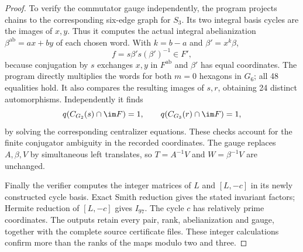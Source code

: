 \begin{proof}
To verify the commutator gauge independently, the program projects
chains to the corresponding six-edge graph for $S_3$. Its two
integral basis cycles are the images of $x,y$. Thus it computes the
actual integral abelianization $\beta^{\mathrm{ab}}=ax+by$ of each
chosen word. With $k=b-a$ and $\beta'=x^k\beta$,
\[
 f=s\beta's(\beta')^{-1}\in F',
\]
because conjugation by $s$ exchanges $x,y$ in $F^{\mathrm{ab}}$ and
$\beta'$ has equal coordinates. The program directly multiplies the
words for both $m=0$ hexagons in $G_6$; all 48 equalities hold.
It also compares the resulting images of $s,r$, obtaining 24 distinct
automorphisms. Independently it finds
\[
 q(C_{G_2}(s)\cap\im F)=1,
 \qquad q(C_{G_3}(r)\cap\im F)=1,
\]
by solving the corresponding centralizer equations. These checks
account for the finite conjugator ambiguity in the recorded
coordinates. The gauge replaces $A,\beta,V$ by simultaneous left
translates, so $T=A^{-1}V$ and $W=\beta^{-1}V$ are unchanged.

Finally the verifier computes the integer matrices of $L$ and
$[L,-c]$ in its newly constructed cycle basis. Exact Smith reduction
gives the stated invariant factors; Hermite reduction of $[L,-c]$
gives $I_{97}$. The cycle $c$ has relatively prime coordinates.
The outputs retain every pair, rank, abelianization and gauge, together
with the complete source certificate files. These integer calculations
confirm more than the ranks of the maps modulo two and three.
\end{proof}

